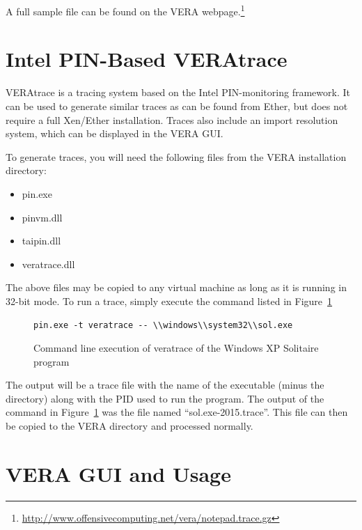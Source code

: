 \documentclass[11pt]{article}
\begin{document}
A full sample file can be found on the VERA webpage.\footnote{\url{http://www.offensivecomputing.net/vera/notepad.trace.gz}}

\section{Intel PIN-Based VERAtrace}\label{sec:pinvera}

VERAtrace is a tracing system based on the Intel PIN-monitoring
framework. It can be used to generate similar traces as can be found
from Ether, but does not require a full Xen/Ether installation. Traces
also include an import resolution system, which can be displayed in
the VERA GUI.

To generate traces, you will need the following files from the VERA
installation directory:

\begin{itemize}
\item pin.exe
\item pinvm.dll
\item taipin.dll
\item veratrace.dll
\end{itemize}

The above files may be copied to any virtual machine as long as it is
running in 32-bit mode. To run a trace, simply execute the command
listed in Figure~\ref{fig:veratrace}

\begin{figure}[htb]
\centering
\begin{verbatim}
pin.exe -t veratrace -- \\windows\\system32\\sol.exe
\end{verbatim}
\caption{Command line execution of veratrace of the Windows XP
Solitaire program}\label{fig:veratrace}
\end{figure}

The output will be a trace file with the name of the executable (minus
the directory) along with the PID used to run the program. The output
of the command in Figure~\ref{fig:veratrace} was the file named
``sol.exe-2015.trace''. This file can then be copied to the VERA directory and processed normally.

\section{VERA GUI and Usage}\label{sec:gui}
\end{document}
